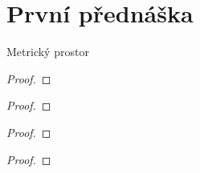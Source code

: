 \documentclass[../main.tex]{subfiles}
\begin{document}
\section{První přednáška}

\begin{definition}
    Metrický prostor
\end{definition}

\begin{definition}[Podprostor]
\end{definition}

\begin{definition}[Izometrie $f$]
\end{definition}

\begin{example}
\end{example}

\begin{lemma}
\end{lemma}
\begin{proof}
\end{proof}

\begin{example}
\end{example}

\begin{lemma}
\end{lemma}
\begin{proof}
\end{proof}

\begin{definition}
\end{definition}

\begin{theorem}
\end{theorem}
\begin{proof}
\end{proof}

\begin{definition}[Ultrametrika]
\end{definition}

\begin{lemma}
\end{lemma}
\begin{proof}
\end{proof}

\begin{definition}[Koule]
\end{definition}
\end{document}
